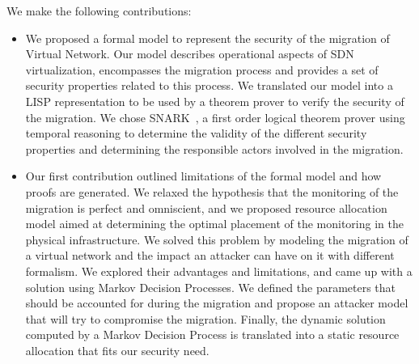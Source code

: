 We make the following contributions:

\begin{itemize}
    \item We proposed a formal model to represent the security of the migration of Virtual Network.
    Our model describes operational aspects of SDN virtualization, encompasses the migration process and provides a set of security properties related to this process. We translated our model into a LISP representation to be used by a theorem prover to verify the security of the migration. We chose SNARK~\cite{snark-Stickel2000}, a first order logical theorem prover using temporal reasoning to determine the validity of the different security properties and determining the responsible actors involved in the migration.
    
    \item Our first contribution outlined limitations of the formal model and how proofs are generated. We relaxed the hypothesis that the monitoring of the migration is perfect and omniscient, and we proposed resource allocation model aimed at determining the optimal placement of the monitoring in the physical infrastructure. We solved this problem by modeling the migration of a virtual network and the impact an attacker can have on it with different formalism. We explored their advantages and limitations, and came up with a solution using Markov Decision Processes. We defined the parameters that should be accounted for during the migration and propose an attacker model that will try to compromise the migration. Finally, the dynamic solution computed by a Markov Decision Process is translated into a static resource allocation that fits our security need.
\end{itemize}


